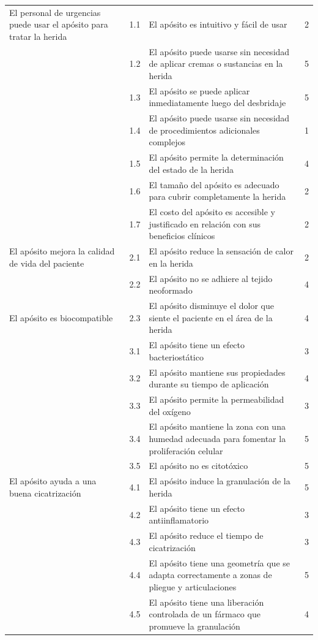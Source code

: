 \documentclass[../../DocumentoCompleto.tex]{subfiles}
\begin{document}
\begin{longtable}{>{\raggedright\arraybackslash}p{4cm} c p{7cm} c}
El personal de urgencias puede usar el apósito para tratar la herida 
& 1.1 & El apósito es intuitivo y fácil de usar & 2 \\
& 1.2 & El apósito puede usarse sin necesidad de aplicar cremas o sustancias en la herida & 5 \\
& 1.3 & El apósito se puede aplicar inmediatamente luego del desbridaje & 5 \\
& 1.4 & El apósito puede usarse sin necesidad de procedimientos adicionales complejos & 1 \\
& 1.5 & El apósito permite la determinación del estado de la herida & 4 \\
& 1.6 & El tamaño del apósito es adecuado para cubrir completamente la herida & 2 \\
& 1.7 & El costo del apósito es accesible y justificado en relación con sus beneficios clínicos & 2 \\
\midrule
El apósito mejora la calidad de vida del paciente 
& 2.1 & El apósito reduce la sensación de calor en la herida & 2 \\
& 2.2 & El apósito no se adhiere al tejido neoformado & 4 \\
\midrule
El apósito es biocompatible 
& 2.3 & El apósito disminuye el dolor que siente el paciente en el área de la herida & 4 \\
& 3.1 & El apósito tiene un efecto bacteriostático & 3 \\
& 3.2 & El apósito mantiene sus propiedades durante su tiempo de aplicación & 4 \\
& 3.3 & El apósito permite la permeabilidad del oxígeno & 3 \\
& 3.4 & El apósito mantiene la zona con una humedad adecuada para fomentar la proliferación celular & 5 \\
& 3.5 & El apósito no es citotóxico & 5 \\
\midrule
El apósito ayuda a una buena cicatrización 
& 4.1 & El apósito induce la granulación de la herida & 5 \\
& 4.2 & El apósito tiene un efecto antiinflamatorio & 3 \\
& 4.3 & El apósito reduce el tiempo de cicatrización & 3 \\
& 4.4 & El apósito tiene una geometría que se adapta correctamente a zonas de pliegue y articulaciones & 5 \\
& 4.5 & El apósito tiene una liberación controlada de un fármaco que promueve la granulación & 4 \\
\end{longtable}
\end{document}
